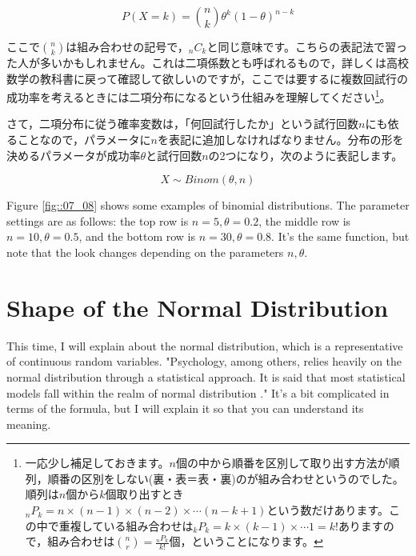\documentclass{ltjbook}
\begin{document}
\[ P(X=k) = \binom{n}{k}\theta^k(1-\theta)^{n-k} \]

ここで$\binom{n}{k}$は組み合わせの記号で，${}_nC_k$と同じ意味です。こちらの表記法で習った人が多いかもしれません。これは二項係数とも呼ばれるもので，詳しくは高校数学の教科書に戻って確認して欲しいのですが，ここでは要するに複数回試行の成功率を考えるときには二項分布になるという仕組みを理解してください\footnote{一応少し補足しておきます。$n$個の中から順番を区別して取り出す方法が順列，順番の区別をしない(裏・表＝表・裏)のが組み合わせというのでした。順列は$n$個から$k$個取り出すとき${}_nP_k = n\times (n-1)\times (n-2) \times \cdots (n-k+1)$という数だけあります。この中で重複している組み合わせは${}_kP_k = k \times (k-1)\times \cdots 1 = k!$ありますので，組み合わせは$\binom{n}{r} = \frac{{}_nP_k}{k!}$個，ということになります。}。

さて，二項分布に従う確率変数は，「何回試行したか」という試行回数$n$にも依ることなので，パラメータに$n$を表記に追加しなければなりません。分布の形を決めるパラメータが成功率$\theta$と試行回数$n$の2つになり，次のように表記します。

\[ X \sim Binom(\theta, n) \]


Figure \ref{fig::07_08} shows some examples of binomial distributions. The parameter settings are as follows: the top row is $n=5,\theta=0.2$, the middle row is $n=10,\theta=0.5$, and the bottom row is $n=30,\theta=0.8$. It's the same function, but note that the look changes depending on the parameters $n,\theta$.

\section{Shape of the Normal Distribution}
This time, I will explain about the normal distribution, which is a representative of continuous random variables.
"Psychology, among others, relies heavily on the normal distribution through a statistical approach. It is said that most statistical models fall within the realm of normal distribution \parencite{Minaka2018}."
It's a bit complicated in terms of the formula, but I will explain it so that you can understand its meaning.
\end{document}
